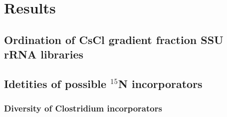 \section{Results}
\subsection{Ordination of CsCl gradient fraction SSU rRNA libraries}
\subsection{Idetities of possible $^{15}$N incorporators}
\subsubsection{Diversity of Clostridium incorporators}



